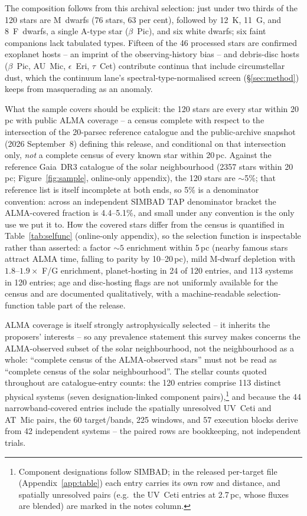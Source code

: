 \documentclass{openjournal}
\begin{document}
The composition follows from this archival selection: just under two
thirds of the 120 stars are M~dwarfs (76 stars, 63 per cent),
followed by 12~K, 11~G, and 8~F~dwarfs, a single A-type star
($\beta$~Pic), and six white dwarfs; six faint companions lack
tabulated types. Fifteen of the 46 processed stars are confirmed
exoplanet hosts -- an imprint of the observing-history bias -- and
debris-disc hosts ($\beta$~Pic, AU~Mic, $\epsilon$~Eri, $\tau$~Cet)
contribute continua that include circumstellar dust, which the
continuum lane's spectral-type-normalised screen (\S\ref{sec:method})
keeps from masquerading as an anomaly.

What the sample covers should be explicit: the 120 stars are every
star within 20\,pc with public ALMA coverage -- a census complete with
respect to the intersection of the 20-parsec reference catalogue and
the public-archive snapshot (2026 September~8) defining this release,
and conditional on that intersection only, \emph{not} a complete
census of every known star within 20\,pc. Against the
reference Gaia~DR3 catalogue of the solar neighbourhood (2357 stars
within 20\,pc; Figure~\ref{fig:sample}, online-only appendix), the
120 stars are $\sim$5\%; that reference list is itself incomplete at
both ends, so 5\% is a denominator convention: across an independent
SIMBAD TAP denominator bracket the ALMA-covered fraction is
4.4--5.1\%, and small under any convention is the only use we put it
to. How the covered stars differ from the census is quantified in
Table~\ref{tab:selfunc} (online-only appendix), so the selection
function is inspectable rather than asserted: a factor ${\sim}5$
enrichment within 5\,pc (nearby famous stars attract ALMA time,
falling to parity by 10--20\,pc), mild M-dwarf depletion with
$1.8$--$1.9\times$ F/G enrichment, planet-hosting in 24 of 120
entries, and 113 systems in 120 entries; age and disc-hosting flags
are not uniformly available for the census and are documented
qualitatively, with a machine-readable selection-function table part
of the release.

ALMA coverage is itself strongly astrophysically selected -- it
inherits the proposers' interests -- so any prevalence statement this
survey makes concerns the ALMA-observed subset of the solar
neighbourhood, not the neighbourhood as a whole: ``complete census of
the ALMA-observed stars'' must not be read as ``complete census of the
solar neighbourhood''. The stellar counts quoted throughout are
catalogue-entry counts: the 120 entries comprise 113 distinct physical
systems (seven designation-linked component
pairs),\footnote{Component designations follow SIMBAD; in
the released per-target file (Appendix~\ref{app:table}) each entry carries its own row and distance, and
spatially unresolved pairs (e.g.\ the UV~Ceti entries at 2.7\,pc,
whose fluxes are blended) are marked in the notes column.} and because
the 44 narrowband-covered entries include the spatially unresolved
UV~Ceti and AT~Mic pairs, the 60 target/bands, 225 windows, and 57
execution blocks derive from 42 independent systems -- the paired rows
are bookkeeping, not independent trials.
\end{document}
